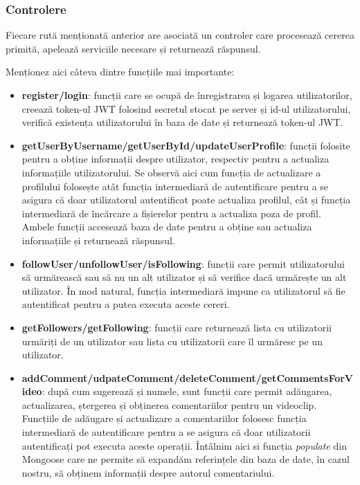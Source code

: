 \subsubsection{Controlere}
Fiecare rută menționată anterior are asociată un controler care procesează cererea primită, 
apelează serviciile necesare și returnează răspunsul.
\par
Menționez aici câteva dintre funcțiile mai importante:

\begin{itemize}
    \item \textbf{register/login}: funcții care se ocupă de înregistrarea și logarea utilizatorilor,
    creează token-ul JWT folosind secretul stocat pe server și id-ul utilizatorului, verifică
    existența utilizatorului în baza de date și returnează token-ul JWT.
    \item \textbf{getUserByUsername/getUserById/updateUserProfile}: funcții folosite pentru a obține informații
    despre utilizator, respectiv pentru a actualiza informațiile utilizatorului. Se observă aici
    cum funcția de actualizare a profilului folosește atât funcția intermediară de autentificare pentru a
    se asigura că doar utilizatorul autentificat poate actualiza profilul, cât și funcția intermediară
    de încărcare a fișierelor pentru a actualiza poza de profil. Ambele funcții accesează baza de
    date pentru a obține sau actualiza informațiile și returnează răspunsul.
    \item \textbf{followUser/unfollowUser/isFollowing}: funcții care permit utilizatorului să urmărească
    sau să nu un alt utilizator și să verifice dacă urmărește un alt utilizator. În mod natural,
    funcția intermediară impune ca utilizatorul să fie autentificat pentru a putea executa aceste cereri.
    \item \textbf{getFollowers/getFollowing}: funcții care returnează lista cu utilizatorii urmăriți de
    un utilizator sau lista cu utilizatorii care îl urmăresc pe un utilizator. 
    \item \textbf{addComment/udpateComment/deleteComment/getCommentsForVideo}: după cum sugerează
    și numele, sunt funcții care permit adăugarea, actualizarea, ștergerea și obținerea comentariilor
    pentru un videoclip. Funcțiile de adăugare și actualizare a comentariilor folosesc funcția intermediară
    de autentificare pentru a se asigura că doar utilizatorii autentificați pot executa aceste operații.
    Întâlnim aici si funcția \textit{populate} din Mongoose care ne permite să expandăm referințele
    din baza de date, în cazul nostru, să obținem informații despre autorul comentariului.

\end{itemize}
